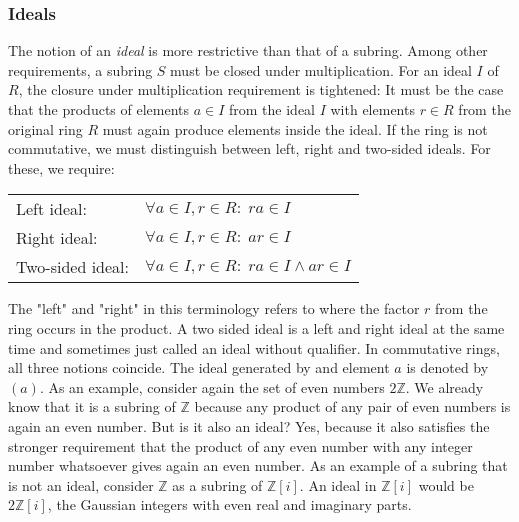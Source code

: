 
\subsubsection{Ideals}
The notion of an \emph{ideal} is more restrictive than that of a subring. Among other requirements, a subring $S$ must be closed under multiplication. For an ideal $I$ of $R$, the closure under multiplication requirement is tightened: It must be the case that the products of elements $a \in I$ from the ideal $I$ with elements $r \in R$ from the original ring $R$ must again produce elements inside the ideal. If the ring is not commutative, we must distinguish between left, right and two-sided ideals. For these, we require:

\medskip
\begin{tabular}{l l}
Left ideal:      & $\forall a \in I, r \in R: \; r a \in I$  \\
Right ideal:     & $\forall a \in I, r \in R: \; a r \in I$  \\
Two-sided ideal: & $\forall a \in I, r \in R: \; r a \in I \wedge a r \in I$  \\
\end{tabular}
\medskip

The "left" and "right" in this terminology refers to where the factor $r$ from the ring occurs in the product. A two sided ideal is a left and right ideal at the same time and sometimes just called an ideal without qualifier. In commutative rings, all three notions coincide. The ideal generated by and element $a$ is denoted by $(a)$. As an example, consider again the set of even numbers $2 \mathbb{Z}$. We already know that it is a subring of $\mathbb{Z}$ because any product of any pair of even numbers is again an even number. But is it also an ideal? Yes, because it also satisfies the stronger requirement that the product of any even number with any integer number whatsoever gives again an even number. As an example of a subring that is not an ideal, consider $\mathbb{Z}$ as a subring of $\mathbb{Z}[i]$. An ideal in $\mathbb{Z}[i]$ would be $2\mathbb{Z}[i]$, the Gaussian integers with even real and imaginary parts.



